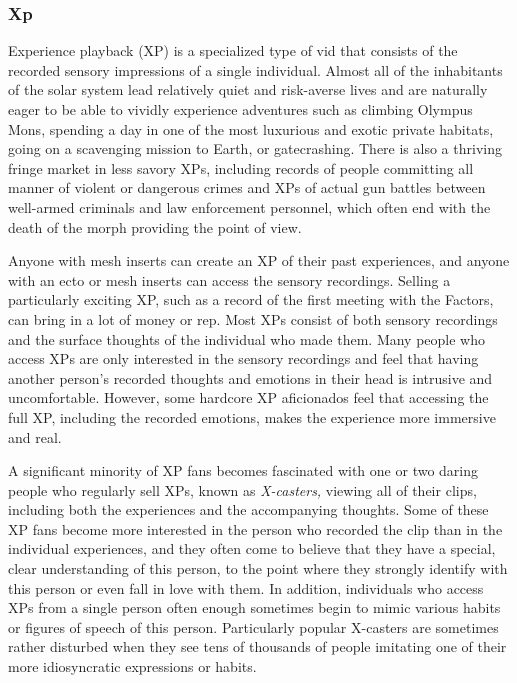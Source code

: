 \subsubsection{Xp}

Experience playback (XP) is a specialized type of vid 
that consists of the recorded sensory impressions of a 
single individual. Almost all of the inhabitants of the 
solar system lead relatively quiet and risk-averse lives 
and are naturally eager to be able to vividly experience 
adventures such as climbing Olympus Mons, spending 
a day in one of the most luxurious and exotic private 
habitats, going on a scavenging mission to Earth, or 
gatecrashing. There is also a thriving fringe market in 
less savory XPs, including records of people committing
all manner of violent or dangerous crimes and
XPs of actual gun battles between well-armed criminals
and law enforcement personnel, which often end
with the death of the morph providing the point of 
view.

Anyone with mesh inserts can create an XP of their 
past experiences, and anyone with an ecto or mesh 
inserts can access the sensory recordings. Selling a 
particularly exciting XP, such as a record of the first 
meeting with the Factors, can bring in a lot of money 
or rep. Most XPs consist of both sensory recordings 
and the surface thoughts of the individual who made 
them. Many people who access XPs are only interested
in the sensory recordings and feel that having
another person's recorded thoughts and emotions in 
their head is intrusive and uncomfortable. However, 
some hardcore XP aficionados feel that accessing the 
full XP, including the recorded emotions, makes the 
experience more immersive and real.

A significant minority of XP fans becomes fascinated
with one or two daring people who regularly
sell XPs, known as \textit{X-casters,} viewing all of their clips, 
including both the experiences and the accompanying 
thoughts. Some of these XP fans become more interested
in the person who recorded the clip than in the
individual experiences, and they often come to believe 
that they have a special, clear understanding of this 
person, to the point where they strongly identify with 
this person or even fall in love with them. In addition, 
individuals who access XPs from a single person often 
enough sometimes begin to mimic various habits or 
figures of speech of this person. Particularly popular 
X-casters are sometimes rather disturbed when they 
see tens of thousands of people imitating one of their 
more idiosyncratic expressions or habits.

